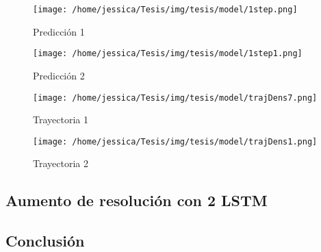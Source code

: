 \begin{figure}[!htbp]
  \centering
  \texttt{[image: /home/jessica/Tesis/img/tesis/model/1step.png]}
  \caption{Predicción 1}
  \label{fig:1step}
\end{figure}

\begin{figure}[!htbp]
  \centering
  \texttt{[image: /home/jessica/Tesis/img/tesis/model/1step1.png]}
  \caption{Predicción 2}
  \label{fig:1step1}
\end{figure}

\begin{figure}[!htbp]
  \centering
  \texttt{[image: /home/jessica/Tesis/img/tesis/model/trajDens7.png]}
  \caption{Trayectoria 1}
  \label{fig:trajec1}
\end{figure}

\begin{figure}[!htbp]
  \centering
  \texttt{[image: /home/jessica/Tesis/img/tesis/model/trajDens1.png]}
  \caption{Trayectoria 2}
  \label{fig:trajec2}
\end{figure}


\subsection{Aumento de resolución con 2 LSTM}



\subsection{Conclusión}


